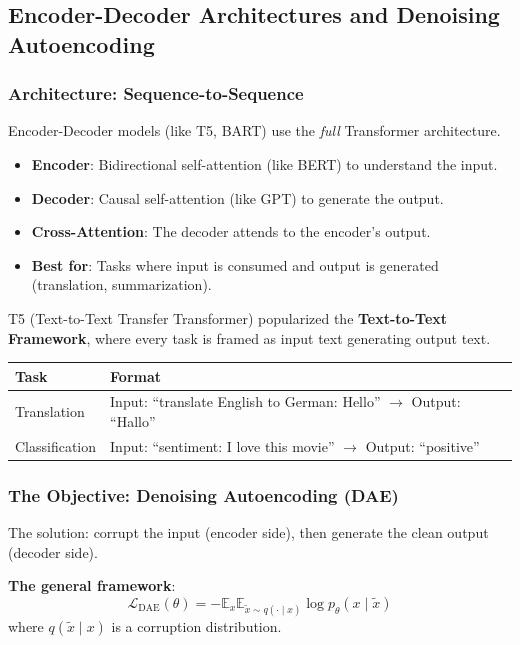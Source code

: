\documentclass{article}
\begin{document}
\subsection{Encoder-Decoder Architectures and Denoising Autoencoding}

\subsubsection{Architecture: Sequence-to-Sequence}

Encoder-Decoder models (like T5, BART) use the \textit{full} Transformer architecture.

\begin{itemize}
\item \textbf{Encoder}: Bidirectional self-attention (like BERT) to understand the input.
\item \textbf{Decoder}: Causal self-attention (like GPT) to generate the output.
\item \textbf{Cross-Attention}: The decoder attends to the encoder's output.
\item \textbf{Best for}: Tasks where input is consumed and output is generated (translation, summarization).
\end{itemize}

T5 (Text-to-Text Transfer Transformer) popularized the \textbf{Text-to-Text Framework}, where every task is framed as input text generating output text.

\begin{center}
\begin{tabular}{ll}
\toprule
\textbf{Task} & \textbf{Format} \\
\midrule
Translation & Input: ``translate English to German: Hello'' $\rightarrow$ Output: ``Hallo'' \\
Classification & Input: ``sentiment: I love this movie'' $\rightarrow$ Output: ``positive'' \\
\bottomrule
\end{tabular}
\end{center}

\subsubsection{The Objective: Denoising Autoencoding (DAE)}

The solution: corrupt the input (encoder side), then generate the clean output (decoder side).

\textbf{The general framework}:
\begin{equation}
\mathcal{L}_{\text{DAE}}(\theta) = -\mathbb{E}_{x} \mathbb{E}_{\tilde{x} \sim q(\cdot \mid x)} \log p_\theta(x \mid \tilde{x})
\end{equation}
where $q(\tilde{x} \mid x)$ is a corruption distribution.
\end{document}
